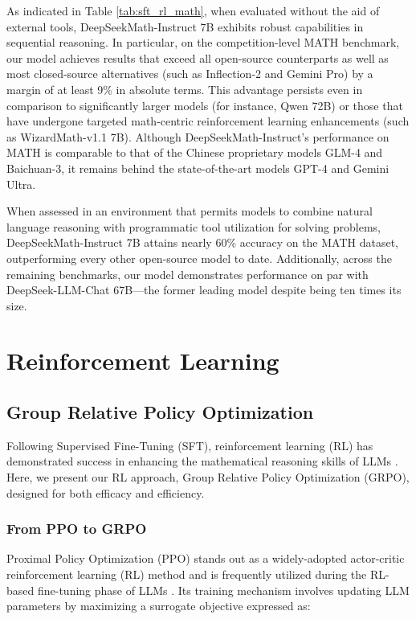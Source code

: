 \begin{itemize}[topsep=0pt]
As indicated in Table \ref{tab:sft_rl_math}, when evaluated without the aid of external tools, DeepSeekMath-Instruct 7B exhibits robust capabilities in sequential reasoning. In particular, on the competition-level MATH benchmark, our model achieves results that exceed all open-source counterparts as well as most closed-source alternatives (such as Inflection-2 and Gemini Pro) by a margin of at least 9\% in absolute terms. This advantage persists even in comparison to significantly larger models (for instance, Qwen 72B) or those that have undergone targeted math-centric reinforcement learning enhancements (such as WizardMath-v1.1 7B). Although DeepSeekMath-Instruct's performance on MATH is comparable to that of the Chinese proprietary models GLM-4 and Baichuan-3, it remains behind the state-of-the-art models GPT-4 and Gemini Ultra.

When assessed in an environment that permits models to combine natural language reasoning with programmatic tool utilization for solving problems, DeepSeekMath-Instruct 7B attains nearly 60\% accuracy on the MATH dataset, outperforming every other open-source model to date. Additionally, across the remaining benchmarks, our model demonstrates performance on par with DeepSeek-LLM-Chat 67B—the former leading model despite being ten times its size.
\section{Reinforcement Learning}

\subsection{Group Relative Policy Optimization} Following Supervised Fine-Tuning (SFT), reinforcement learning (RL) has demonstrated success in enhancing the mathematical reasoning skills of LLMs \citep{wang2023math,wizardmath}. Here, we present our RL approach, Group Relative Policy Optimization (GRPO), designed for both efficacy and efficiency.

\subsubsection{From PPO to GRPO} Proximal Policy Optimization (PPO) \citep{schulman2017proximal} stands out as a widely-adopted actor-critic reinforcement learning (RL) method and is frequently utilized during the RL-based fine-tuning phase of LLMs \citep{ouyang2022training}. Its training mechanism involves updating LLM parameters by maximizing a surrogate objective expressed as:


\end{itemize}
